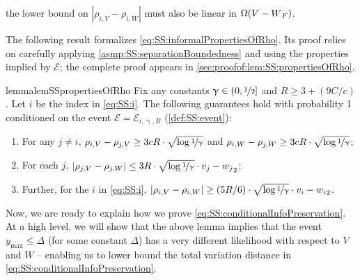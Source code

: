 \documentclass[11pt,letterpaper]{article}
\theoremstyle{plain}
\theoremstyle{definition}
\theoremstyle{remark}
\def\abs#1{\left| #1 \right|}
\newcommand{\inparen}[1]{\ensuremath{\left(#1\right)}}
\let\norm\relax
\newcommand{\norm}[1]{\ensuremath{\left\lVert #1 \right\rVert}}
\newcommand{\evE}{\ensuremath{\mathscr{E}}}
\newcommand{\sfrac}[2]{{#1/#2}}
\newcommand{\nfrac}[2]{\nicefrac{#1}{#2}}
\renewcommand{\gamma}{\upgamma}
\newcommand{\ymax}{y_{\max}}
\begin{document}
{{\begin{itemize}
                    the lower bound on $\abs{\rho_{i,V}-\rho_{i,W}}$ must also be linear in $\Omega(\norm{V-W}_F)$.
            \end{itemize}
        The following result formalizes \cref{eq:SS:informalPropertiesOfRho}.
        Its proof relies on carefully applying \cref{asmp:SS:separationBoundedness} and using the properties implied by $\evE$; the complete proof appears in \cref{sec:proofof:lem:SS:propertiesOfRho}. 
        \begin{restatable}{lemma}{lemSSpropertiesOfRho}
            \label{lem:SS:propertiesOfRho} 
            Fix any constants $\gamma\in (0,\nfrac{1}{2}]$ and $R\geq 3 + (\sfrac{9C}{c})$.
            Let $i$ be the index in \cref{eq:SS:i}.
            The following guarantees hold {with probability 1}
            conditioned on the event $\evE= \evE_{i,\gamma,R}$ (\cref{def:SS:event}):
            \begin{enumerate}
                \item 
                    For any $j\neq i$,
                    $\rho_{i,V} - \rho_{j, V}\geq 3cR \cdot \sqrt{\log{\nfrac{1}{\gamma}}}$ and 
                    $ \rho_{i, W} - \rho_{j, W}\geq  3cR \cdot  \sqrt{\log{\nfrac{1}{\gamma}}}$;
                \item For each $j$,
                    $\abs{\rho_{j, V} - \rho_{j, W}}\leq 3R \cdot \sqrt{\log{\nfrac{1}{\gamma}}}\cdot \norm{v_j - w_j}_2$; 
                \item Further, for the $i$ in \cref{eq:SS:i}, $\abs{\rho_{i,V} - \rho_{i,W}}\geq \inparen{\sfrac{5R}{6}} \cdot \sqrt{\log{\nfrac{1}{\gamma}}}\cdot \norm{v_i - w_i}_2$.
            \end{enumerate}
        \end{restatable}
    Now, we are ready to explain how we prove \cref{eq:SS:conditionalInfoPreservation}. 
    At a high level, {we will show that} the above lemma implies that the event $\ymax\leq \Delta$ (for some constant $\Delta$) has a very different likelihood with respect to $V$ and $W$ -- enabling us to lower bound the total variation distance in \cref{eq:SS:conditionalInfoPreservation}.
    
}}
\end{document}
